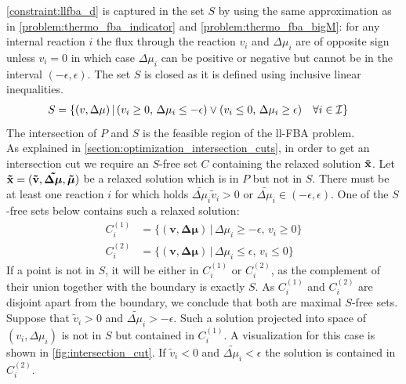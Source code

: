 \newpage
\cref{constraint:llfba_d} is captured in the set $S$ by using the same approximation as in \cref{problem:thermo_fba_indicator} and \cref{problem:thermo_fba_bigM}:
for any internal reaction $i$ the flux through the reaction $v_i$ and $\Delta \mu_i$ are of opposite sign unless $v_i=0$ in which case $\Delta \mu_i$ can be positive or negative but cannot be in the interval $(- \epsilon, \epsilon)$. The set $S$ is closed as it is defined using inclusive linear inequalities. 
\begin{align*}
    \centering
    S &= \{(v, \Delta\mu) \, | \, (v_i \geq 0, \, \Delta \mu_i \leq - \epsilon) \lor (v_i \leq 0, \, \Delta \mu_i \geq \epsilon) \quad \forall i \in \mathcal{I}\}
\end{align*}
The intersection of $P$ and $S$ is the feasible region of the ll-FBA problem. \\ 
As explained in \cref{section:optimization_intersection_cuts}, in order to get an intersection cut we require an $S$-free set $C$ containing the relaxed solution $\bold{\tilde x}$. Let $\bold{\tilde x} = (\bold{\tilde v}, \boldsymbol{\tilde{\Delta \mu}}, \boldsymbol{\tilde \mu})$ be a relaxed solution which is in $P$ but not in $S$. There must be at least one reaction $i$ for which holds $\tilde{\Delta \mu_i} \tilde v_i > 0$ or $\tilde{\Delta \mu_i} \in (- \epsilon, \epsilon)$. One of the $S$-free sets below contains such a relaxed solution:
\begin{align*}
    C_i^{(1)} &= \{(\mathbf v, \boldsymbol{\Delta\mu}) \, | \, \Delta \mu_i \geq - \epsilon, \, v_i \geq 0\} \\
    C_i^{(2)} &= \{(\mathbf v, \boldsymbol{\Delta\mu}) \, | \, \Delta \mu_i \leq \epsilon, \, v_i \leq 0\} %
\end{align*}
If a point is not in $S$, it will be either in $C_i^{(1)}$ or $C_i^{(2)}$, as the complement of their union together with the boundary is exactly $S$. As $C_i^{(1)}$ and $C_i^{(2)}$ are disjoint apart from the boundary, we conclude that both are maximal $S$-free sets. %
Suppose that $\tilde v_i > 0$ and $\tilde{\Delta \mu_i} > -\epsilon$. Such a solution projected into space of $(v_i, \Delta \mu_i)$ is not in $S$ but contained in $C_i^{(1)}$. A visualization for this case is shown in \cref{fig:intersection_cut}. If $\tilde v_i < 0$ and $\tilde{\Delta \mu_i} < \epsilon$ the solution is contained in $C_i^{(2)}$.

